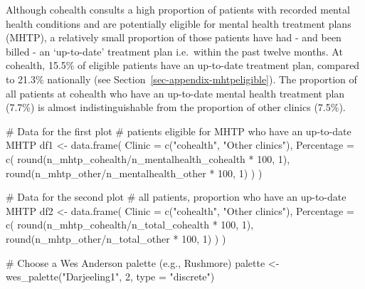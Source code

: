 \documentclass[
  letterpaper,
  DIV=11,
  numbers=noendperiod,
  oneside]{scrartcl}
\newenvironment{Shaded}{\begin{snugshade}}{\end{snugshade}}
\newcommand{\AttributeTok}[1]{\textcolor[rgb]{0.40,0.45,0.13}{#1}}
\newcommand{\CommentTok}[1]{\textcolor[rgb]{0.37,0.37,0.37}{#1}}
\newcommand{\DecValTok}[1]{\textcolor[rgb]{0.68,0.00,0.00}{#1}}
\newcommand{\FunctionTok}[1]{\textcolor[rgb]{0.28,0.35,0.67}{#1}}
\newcommand{\NormalTok}[1]{\textcolor[rgb]{0.00,0.23,0.31}{#1}}
\newcommand{\OtherTok}[1]{\textcolor[rgb]{0.00,0.23,0.31}{#1}}
\newcommand{\SpecialCharTok}[1]{\textcolor[rgb]{0.37,0.37,0.37}{#1}}
\newcommand{\StringTok}[1]{\textcolor[rgb]{0.13,0.47,0.30}{#1}}
\begin{document}
Although cohealth consults a high proportion of patients with recorded
mental health conditions and are potentially eligible for mental health
treatment plans (MHTP), a relatively small proportion of those patients
have had - and been billed - an `up-to-date' treatment plan i.e.~within
the past twelve months. At cohealth, 15.5\% of eligible patients have an
up-to-date treatment plan, compared to 21.3\% nationally (see
Section~\ref{sec-appendix-mhtpeligible}). The proportion of all patients
at cohealth who have an up-to-date mental health treatment plan (7.7\%)
is almost indistinguishable from the proportion of other clinics
(7.5\%).

\begin{Shaded}
\begin{Highlighting}[]
\CommentTok{\# Data for the first plot}
\CommentTok{\# patients eligible for MHTP who have an up{-}to{-}date MHTP}
\NormalTok{df1 }\OtherTok{\textless{}{-}} \FunctionTok{data.frame}\NormalTok{(}
  \AttributeTok{Clinic =} \FunctionTok{c}\NormalTok{(}\StringTok{"cohealth"}\NormalTok{, }\StringTok{"Other clinics"}\NormalTok{),}
  \AttributeTok{Percentage =} \FunctionTok{c}\NormalTok{(}
    \FunctionTok{round}\NormalTok{(n\_mhtp\_cohealth}\SpecialCharTok{/}\NormalTok{n\_mentalhealth\_cohealth }\SpecialCharTok{*} \DecValTok{100}\NormalTok{, }\DecValTok{1}\NormalTok{),}
    \FunctionTok{round}\NormalTok{(n\_mhtp\_other}\SpecialCharTok{/}\NormalTok{n\_mentalhealth\_other }\SpecialCharTok{*} \DecValTok{100}\NormalTok{, }\DecValTok{1}\NormalTok{)}
\NormalTok{  )}
\NormalTok{)}

\CommentTok{\# Data for the second plot}
\CommentTok{\# all patients, proportion who have an up{-}to{-}date MHTP}
\NormalTok{df2 }\OtherTok{\textless{}{-}} \FunctionTok{data.frame}\NormalTok{(}
  \AttributeTok{Clinic =} \FunctionTok{c}\NormalTok{(}\StringTok{"cohealth"}\NormalTok{, }\StringTok{"Other clinics"}\NormalTok{),}
  \AttributeTok{Percentage =} \FunctionTok{c}\NormalTok{(}
    \FunctionTok{round}\NormalTok{(n\_mhtp\_cohealth}\SpecialCharTok{/}\NormalTok{n\_total\_cohealth }\SpecialCharTok{*} \DecValTok{100}\NormalTok{, }\DecValTok{1}\NormalTok{),}
    \FunctionTok{round}\NormalTok{(n\_mhtp\_other}\SpecialCharTok{/}\NormalTok{n\_total\_other }\SpecialCharTok{*} \DecValTok{100}\NormalTok{, }\DecValTok{1}\NormalTok{)}
\NormalTok{  )}
\NormalTok{)}

\CommentTok{\# Choose a Wes Anderson palette (e.g., \textquotesingle{}Rushmore\textquotesingle{})}
\NormalTok{palette }\OtherTok{\textless{}{-}} \FunctionTok{wes\_palette}\NormalTok{(}\StringTok{"Darjeeling1"}\NormalTok{, }\DecValTok{2}\NormalTok{, }\AttributeTok{type =} \StringTok{"discrete"}\NormalTok{)}


\end{Highlighting}
\end{Shaded}
\end{document}

